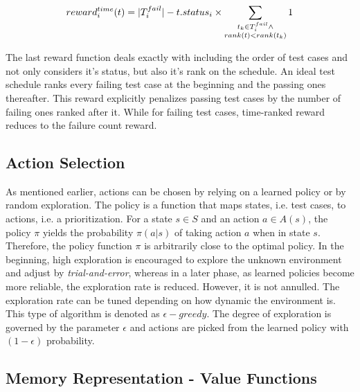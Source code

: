 \begin{equation}
	reward_{i}^{time}(t) = \lvert T_i^{fail}\rvert - t.status_i \times \sum_{\substack{t_k \in T_i^{fail} \wedge \\ rank(t) < rank(t_k)}} 1
\end{equation}

The last reward function deals exactly with including the order of test cases and not only considers it's status, but also it's rank on the schedule. An ideal test schedule ranks every failing test case at the beginning and the passing ones thereafter. This reward explicitly penalizes passing test cases by the number of failing ones ranked after it. While for failing test cases, time-ranked reward reduces to the failure count reward.  

\subsection{Action Selection}

As mentioned earlier, actions can be chosen by relying on a learned policy or by random exploration. The policy is a function that maps states, i.e. test cases, to actions, i.e. a prioritization. For a state $s \in S$ and an action $a \in A(s)$, the policy $\pi$ yields the probability $\pi(a|s)$ of taking action $a$ when in state $s$. Therefore, the policy function $\pi$ is arbitrarily close to the optimal policy. In the beginning, high exploration is encouraged to explore the unknown environment and adjust by \textit{trial-and-error}, whereas in a later phase, as learned policies become more reliable, the exploration rate is reduced. However, it is not annulled. The exploration rate can be tuned depending on how dynamic the environment is. This type of algorithm is denoted as $\epsilon -greedy$. The degree of exploration is governed by the parameter $\epsilon$ and actions are picked from the learned policy with $(1-\epsilon)$ probability.

\subsection{Memory Representation - Value Functions}

